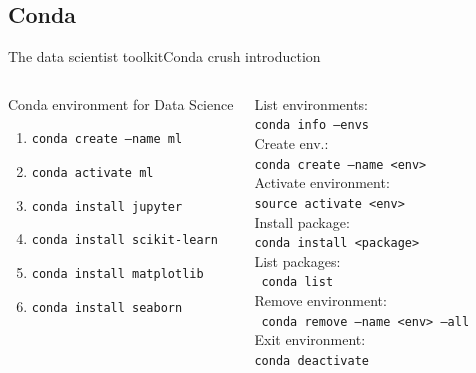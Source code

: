 \documentclass[10pt,compress]{beamer} %
\begin{document}
\subsection{Conda}
\begin{frame}{The data scientist toolkit}{Conda crush introduction}
    \begin{columns}
	   \begin{block}{Conda environment for Data Science}
	   	\begin{enumerate}
			\item \texttt{conda create --name ml}
			\item \texttt{conda activate ml}
			\item \texttt{conda install jupyter}
			\item \texttt{conda install scikit-learn}
			\item \texttt{conda install matplotlib}
			\item \texttt{conda install seaborn}
		\end{enumerate}
	   \end{block}

		List environments: \\ \quad \texttt{conda info --envs}\\
		Create env.: \\ \quad \texttt{conda create --name <env>}\\
		Activate environment: \\ \quad \texttt{source activate <env>}\\
		Install package: \\ \quad \texttt{conda install <package>}\\
		List packages: \\ \quad \texttt{conda list}\\
		Remove environment: \\ \quad \texttt{conda remove --name <env> --all}\\
		Exit environment: \\ \quad \indent \texttt{conda deactivate}
	\end{columns}
\end{frame}
\end{document}
